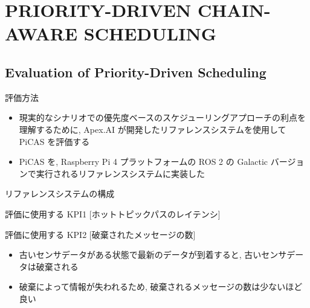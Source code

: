 
\section{PRIORITY-DRIVEN CHAIN-AWARE SCHEDULING}
\label{sec: priority-driven chain-aware scheduling}

\subsection{Evaluation of Priority-Driven Scheduling}
\label{ssec: evaluation of priority-driven scheduling}

\begin{frame}{評価方法}
    \begin{itemize}
        \item 現実的なシナリオでの優先度ベースのスケジューリングアプローチの利点を理解するために, Apex.AI が開発したリファレンスシステムを使用して PiCAS を評価する
        \item PiCAS を, Raspberry Pi 4 プラットフォームの ROS 2 の Galactic バージョンで実行されるリファレンスシステムに実装した
    \end{itemize}
\end{frame}

\begin{frame}{リファレンスシステムの構成}
\end{frame}

\begin{frame}{評価に使用する KPI1 [ホットトピックパスのレイテンシ]}
\end{frame}

\begin{frame}{評価に使用する KPI2 [破棄されたメッセージの数]}
    \begin{itemize}
        \item 古いセンサデータがある状態で最新のデータが到着すると, 古いセンサデータは破棄される
        \item 破棄によって情報が失われるため, 破棄されるメッセージの数は少ないほど良い
    \end{itemize}
\end{frame}

